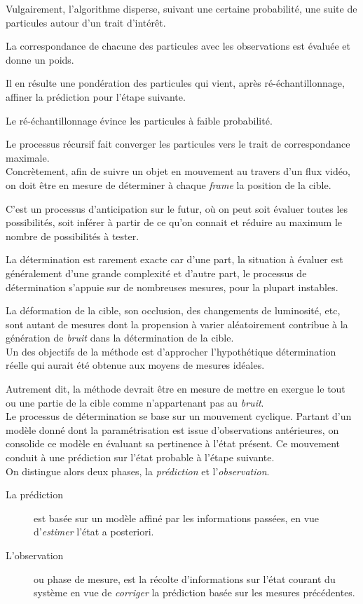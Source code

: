 \documentclass[a4paper,11pt]{report}
\begin{document}
Vulgairement, l'algorithme disperse, suivant une certaine probabilité, une suite de particules autour d'un trait d'intérêt. 

La correspondance de chacune des particules avec les observations est évaluée et donne un poids. 

Il en résulte une pondération des particules qui vient, après ré-échantillonnage, affiner la prédiction pour l'étape suivante. 

Le ré-échantillonnage évince les particules à faible probabilité. 

Le processus récursif fait converger les particules vers le trait de correspondance maximale.\\

Concrètement, afin de suivre un objet en mouvement au travers d'un flux vidéo, on doit être en mesure de déterminer à chaque \textit{frame} la position de la cible. 

C'est un processus d'anticipation sur le futur, où on peut soit évaluer toutes les possibilités, soit inférer à partir de ce qu'on connait et réduire au maximum le nombre de possibilités à tester. 

La détermination est rarement exacte car d'une part, la situation à évaluer est généralement d'une grande complexité et d'autre part, le processus de détermination s'appuie sur de nombreuses mesures, pour la plupart instables. 

La déformation de la cible, son occlusion, des changements de luminosité, etc, sont autant de mesures dont la propension à varier aléatoirement contribue à la génération de \emph{bruit} dans la détermination de la cible.\\  

Un des objectifs de la méthode est d'approcher l'hypothétique détermination réelle qui aurait été obtenue aux moyens de mesures idéales. 

Autrement dit, la méthode devrait être en mesure de mettre en exergue le tout ou une partie de la cible comme n'appartenant pas au \emph{bruit}.\\

Le processus de détermination se base sur un mouvement cyclique. Partant d'un modèle donné dont la paramétrisation est issue d'observations antérieures, on consolide ce modèle en évaluant sa pertinence à l'état présent. Ce mouvement conduit à une prédiction sur l'état probable à l'étape suivante.\\ 

On distingue alors deux phases, la \textit{prédiction} et l'\textit{observation}. 
\begin{description}
\item [La prédiction] est basée sur un modèle affiné par les informations passées, en vue d'\textit{estimer} l'état a posteriori.
\item [L'observation] ou phase de mesure, est la récolte d'informations sur l'état courant du système en vue de \textit{corriger} la prédiction basée sur les mesures précédentes.\\
\end{description}
 
\end{document}
